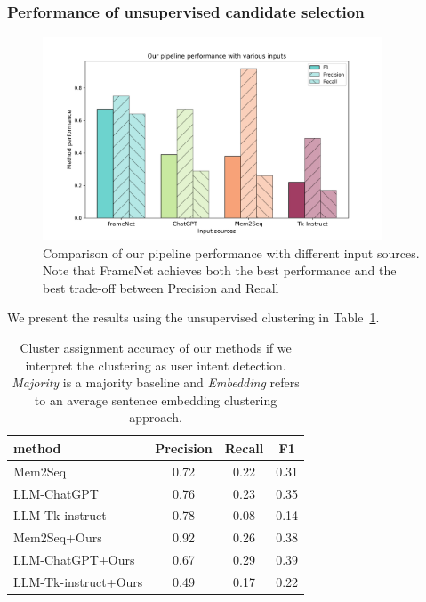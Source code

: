 \subsubsection{Performance of unsupervised candidate selection}
\begin{figure}[h]
    \centering
    \includegraphics[width=0.9\textwidth]{images/slot-discovery.png}
    \caption{Comparison of our pipeline performance with different input sources. Note that FrameNet achieves both the best performance and the best trade-off between Precision and Recall}
    \label{04:fig:compare_sources}
\end{figure}
We present the results using the unsupervised clustering in Table~\ref{04:tab:unsup-discovery}.
\begin{table}[h]
    \centering
    \small
    \begin{tabular}{lccc}
    \hline
     \textbf{method} & \textbf{Precision} & \textbf{Recall} & \textbf{F1} \\
     \hline
     Mem2Seq & 0.72 & 0.22 & 0.31 \\
     LLM-ChatGPT & 0.76 & 0.23 & 0.35 \\
     LLM-Tk-instruct & 0.78 & 0.08 & 0.14 \\
     Mem2Seq+Ours & 0.92 & 0.26 & 0.38 \\
     LLM-ChatGPT+Ours & 0.67 & 0.29 & 0.39 \\
     LLM-Tk-instruct+Ours & 0.49 & 0.17 & 0.22 \\
     
     \hline
    \end{tabular}
    
    \caption{Cluster assignment accuracy of our methods if we interpret the clustering as user intent detection. \textit{Majority} is a majority baseline and \textit{Embedding} refers to an average sentence embedding clustering approach.
    }
    \label{04:tab:unsup-discovery}
\end{table}
